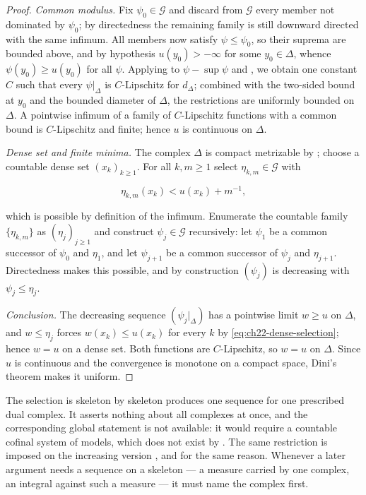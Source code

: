 \begin{proof}
\emph{Common modulus.}  Fix $\psi_0\in\mathcal G$ and discard from
$\mathcal G$ every member not dominated by $\psi_0$; by directedness the
remaining family is still downward directed with the same infimum.  All
members now satisfy $\psi\leq\psi_0$, so their suprema are bounded above,
and by hypothesis $u(y_0)>-\infty$ for some $y_0\in\Delta$, whence
$\psi(y_0)\geq u(y_0)$ for all $\psi$.  Applying
 to
$\psi-\sup\psi$ and , we obtain one
constant $C$ such that every $\psi|_\Delta$ is $C$-Lipschitz for
$d_\Delta$; combined with the two-sided bound at $y_0$ and the bounded
diameter of $\Delta$, the restrictions are uniformly bounded on
$\Delta$.  A pointwise infimum of a family of $C$-Lipschitz functions
with a common bound is $C$-Lipschitz and finite; hence $u$ is continuous
on $\Delta$.

\emph{Dense set and finite minima.}  The complex $\Delta$ is compact
metrizable by ; choose a countable dense set
$(x_k)_{k\geq1}$.  For all $k,m\geq1$ select
$\eta_{k,m}\in\mathcal G$ with

\[
                     \eta_{k,m}(x_k)<u(x_k)+m^{-1},
\tag{22.81}\label{eq:ch22-dense-selection}
\]

which is possible by definition of the infimum.  Enumerate the countable
family $\{\eta_{k,m}\}$ as $(\eta_j)_{j\geq1}$ and construct
$\psi_j\in\mathcal G$ recursively: let $\psi_1$ be a common successor of
$\psi_0$ and $\eta_1$, and let $\psi_{j+1}$ be a common successor of
$\psi_j$ and $\eta_{j+1}$.  Directedness makes this possible, and by
construction $(\psi_j)$ is decreasing with
$\psi_j\leq\eta_j$.

\emph{Conclusion.}  The decreasing sequence $(\psi_j|_\Delta)$ has a
pointwise limit $w\geq u$ on $\Delta$, and $w\leq\eta_j$ forces
$w(x_k)\leq u(x_k)$ for every $k$ by
\eqref{eq:ch22-dense-selection}; hence $w=u$ on a dense set.  Both
functions are $C$-Lipschitz, so $w=u$ on $\Delta$.  Since $u$ is
continuous and the convergence is monotone on a compact space, Dini's
theorem  makes it uniform.
\end{proof}

\begin{warning}{The selection is skeleton by skeleton}
 produces one sequence for one
prescribed dual complex.  It asserts nothing about all complexes at once,
and the corresponding global statement is not available: it would require a
countable cofinal system of models, which does not exist by
.  The same restriction is imposed on the
increasing version , and for the
same reason.  Whenever a later argument needs a sequence on a skeleton --- a
measure carried by one complex, an integral against such a measure --- it
must name the complex first.
\end{warning}

